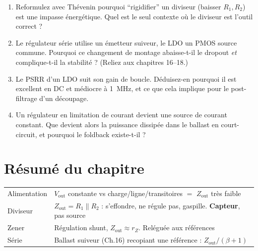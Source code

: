 \documentclass[12pt,a4paper,twoside]{book}
\begin{document}
\begin{enumerate}[nosep]
\item Reformulez avec Thévenin pourquoi ``rigidifier'' un diviseur (baisser $R_1, R_2$) est une impasse énergétique. Quel est le seul contexte où le diviseur est l'outil correct ?
\item Le régulateur série utilise un émetteur suiveur, le LDO un PMOS source commune. Pourquoi ce changement de montage abaisse-t-il le dropout \textit{et} complique-t-il la stabilité ? (Reliez aux chapitres 16--18.)
\item Le PSRR d'un LDO suit son gain de boucle. Déduisez-en pourquoi il est excellent en DC et médiocre à \SI{1}{MHz}, et ce que cela implique pour le post-filtrage d'un découpage.
\item Un régulateur en limitation de courant devient une source de courant constant. Que devient alors la puissance dissipée dans le ballast en court-circuit, et pourquoi le foldback existe-t-il ?
\end{enumerate}

\section*{Résumé du chapitre}

\begin{bases}[title={\color{white} Résumé --- Les Bases}]
\begin{center}
\renewcommand{\arraystretch}{1.3}
\begin{tabular}{p{3.5cm}p{9.5cm}}
\toprule
Alimentation & $V_{\text{out}}$ constante vs charge/ligne/transitoires $=$ $Z_{\text{out}}$ très faible \\
Diviseur & $Z_{\text{out}} = R_1\parallel R_2$ : s'effondre, ne régule pas, gaspille. \textbf{Capteur}, pas source \\
Zener & Régulation shunt, $Z_{\text{out}} \approx r_Z$. Reléguée aux références \\
Série & Ballast suiveur (Ch.16) recopiant une référence : $Z_{\text{out}}/(\beta{+}1)$ \\
\bottomrule
\end{tabular}
\end{center}
\end{bases}
\end{document}
